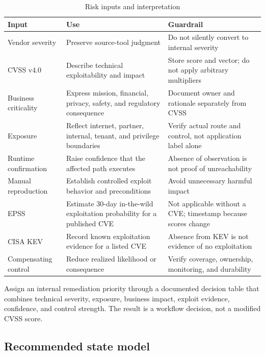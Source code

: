 \documentclass[11pt,letterpaper]{article}
\begin{document}
\begin{table}[H]
\centering
\caption{Risk inputs and interpretation}
\small
\begin{tabularx}{\textwidth}{@{}L{1.45in}Y Y@{}}
\toprule
\textbf{Input} & \textbf{Use} & \textbf{Guardrail} \\
\midrule
Vendor severity & Preserve source-tool judgment & Do not silently convert to internal severity \\
CVSS v4.0 & Describe technical exploitability and impact & Store score and vector; do not apply arbitrary multipliers \\
Business criticality & Express mission, financial, privacy, safety, and regulatory consequence & Document owner and rationale separately from CVSS \\
Exposure & Reflect internet, partner, internal, tenant, and privilege boundaries & Verify actual route and control, not application label alone \\
Runtime confirmation & Raise confidence that the affected path executes & Absence of observation is not proof of unreachability \\
Manual reproduction & Establish controlled exploit behavior and preconditions & Avoid unnecessary harmful impact \\
EPSS & Estimate 30-day in-the-wild exploitation probability for a published CVE & Not applicable without a CVE; timestamp because scores change \citep{firstepss} \\
CISA KEV & Record known exploitation evidence for a listed CVE & Absence from KEV is not evidence of no exploitation \citep{cisakev} \\
Compensating control & Reduce realized likelihood or consequence & Verify coverage, ownership, monitoring, and durability \\
\bottomrule
\end{tabularx}
\end{table}

Assign an internal remediation priority through a documented decision table that combines technical severity, exposure, business impact, exploit evidence, confidence, and control strength. The result is a workflow decision, not a modified CVSS score.

\subsection{Recommended state model}
\end{document}
